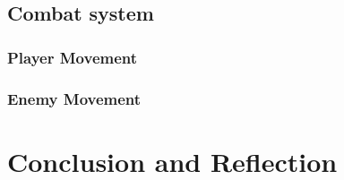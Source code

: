 \documentclass[a4paper,12pt,oneside]{scrreprt}
\begin{document}
\section{Combat system}
\subsection{Player Movement}
\subsection{Enemy Movement}

\chapter{Conclusion and Reflection}



\clearpage
{}
{}
\listoffigures

\clearpage
{}
{}
\printbibliography
\end{document}
